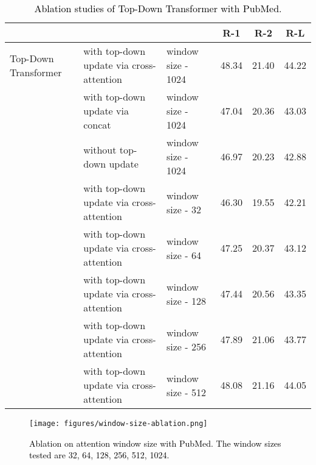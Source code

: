 \documentclass{article} \usepackage{iclr2022_conference,times}
\begin{document}
\begin{table}[!htbp]
\small
\centering
\begin{tabular}{l l l c c c} 
\toprule
& & & R-1 & R-2 & R-L \\
\hline
Top-Down Transformer & with top-down update via cross-attention & window size - 1024 & 48.34 & 21.40 & 44.22 \\ 
& with top-down update via concat  & window size - 1024 & 47.04 & 20.36 & 43.03 \\ 
& without top-down update & window size - 1024 & 46.97 & 20.23 & 42.88 \\ 
\hline
& with top-down update via cross-attention & window size - 32 & 46.30 & 19.55 & 42.21 \\ 
& with top-down update via cross-attention & window size - 64  & 47.25 & 20.37 & 43.12 \\ 
& with top-down update via cross-attention & window size - 128  & 47.44 & 20.56 & 43.35 \\ 
& with top-down update via cross-attention & window size - 256  & 47.89 & 21.06 & 43.77 \\ 
& with top-down update via cross-attention & window size - 512  & 48.08 & 21.16 & 44.05 \\ 
\hline
\end{tabular}
\caption{\textcolor{black}{Ablation studies of Top-Down Transformer with PubMed.}}
\label{table:ablation-all}
\end{table}

\begin{figure}[!htbp]
    \centering
    \texttt{[image: figures/window-size-ablation.png]}
    \caption{\footnotesize \textcolor{black}{Ablation on attention window size with PubMed. The window sizes tested are 32, 64, 128, 256, 512, 1024.} }
    \label{fig:ablation-window}
\end{figure}
\end{document}
